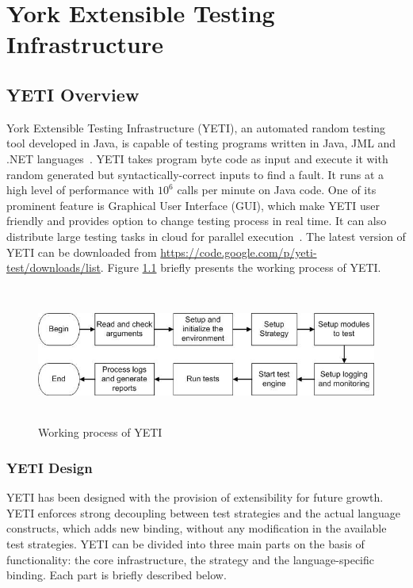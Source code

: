 \chapter{York Extensible Testing Infrastructure}
\label{chap:yeti_3}




\section{YETI Overview}
York Extensible Testing Infrastructure (YETI), an automated random testing tool developed in Java, is capable of testing programs written in Java, JML and .NET languages~\cite{Oriol2010c}. YETI takes program byte code as input and execute it with random generated but syntactically-correct inputs to find a fault. It runs at a high level of performance with $10^6$ calls per minute on Java code. One of its prominent feature is Graphical User Interface (GUI), which make YETI user friendly and provides option to change testing process in real time. It can also distribute large testing tasks in cloud for parallel execution~\cite{Oriol2010}. The latest version of YETI can be downloaded from \url{https://code.google.com/p/yeti-test/downloads/list}. Figure \ref{fig:yetiOverview} briefly presents the working process of YETI. 
\begin{figure}[h]
	\centering
	\includegraphics[width=15cm, height=4.5cm]{chapter3/yetiOverview.png}
	\caption{Working process of YETI}
	\label{fig:yetiOverview}
\end{figure}


\subsection{YETI Design}
YETI has been designed with the provision of extensibility for future growth. YETI enforces strong decoupling between test strategies and the actual language constructs, which adds new binding, without any modification in the available test strategies. YETI can be divided into three main parts on the basis of functionality: the core infrastructure, the strategy and the language-specific binding. Each part is briefly described below. 


